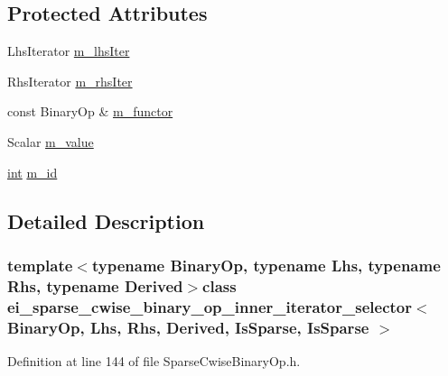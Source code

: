 \subsection*{Protected Attributes}
\begin{DoxyCompactItemize}
\item 
Lhs\-Iterator \hyperlink{classei__sparse__cwise__binary__op__inner__iterator__selector_3_01_binary_op_00_01_lhs_00_01_rhs41884b18ee8e06a3d784c3c098ec6b91_a4c051ffc9a659c9719ecccee2167e0df}{m\-\_\-lhs\-Iter}
\item 
Rhs\-Iterator \hyperlink{classei__sparse__cwise__binary__op__inner__iterator__selector_3_01_binary_op_00_01_lhs_00_01_rhs41884b18ee8e06a3d784c3c098ec6b91_a04c14eedbcb446aadbc695ba362b4578}{m\-\_\-rhs\-Iter}
\item 
const Binary\-Op \& \hyperlink{classei__sparse__cwise__binary__op__inner__iterator__selector_3_01_binary_op_00_01_lhs_00_01_rhs41884b18ee8e06a3d784c3c098ec6b91_a77e68428923946cf9249aa8cd2b4034d}{m\-\_\-functor}
\item 
Scalar \hyperlink{classei__sparse__cwise__binary__op__inner__iterator__selector_3_01_binary_op_00_01_lhs_00_01_rhs41884b18ee8e06a3d784c3c098ec6b91_a7692a3373b8de4be09166b217fb1a8c1}{m\-\_\-value}
\item 
\hyperlink{ioapi_8h_a787fa3cf048117ba7123753c1e74fcd6}{int} \hyperlink{classei__sparse__cwise__binary__op__inner__iterator__selector_3_01_binary_op_00_01_lhs_00_01_rhs41884b18ee8e06a3d784c3c098ec6b91_a028ecee5335c802e5518b5d7af7de245}{m\-\_\-id}
\end{DoxyCompactItemize}


\subsection{Detailed Description}
\subsubsection*{template$<$typename Binary\-Op, typename Lhs, typename Rhs, typename Derived$>$class ei\-\_\-sparse\-\_\-cwise\-\_\-binary\-\_\-op\-\_\-inner\-\_\-iterator\-\_\-selector$<$ Binary\-Op, Lhs, Rhs, Derived, Is\-Sparse, Is\-Sparse $>$}



Definition at line 144 of file Sparse\-Cwise\-Binary\-Op.\-h.



